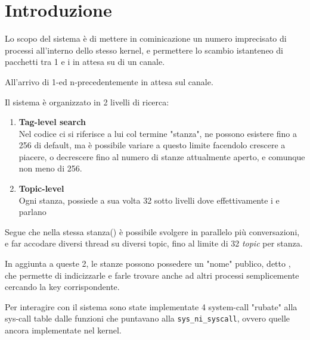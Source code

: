 \section{Introduzione}

Lo scopo del sistema è di mettere in cominicazione un numero imprecisato di
processi all'interno dello stesso kernel, e permettere lo scambio istanteneo
di pacchetti tra 1 \Writer e i \Reader in attesa su di un canale.

All'arrivo di 1-\Writer ed n-\Reader precedentemente in attesa sul canale.

Il sistema è organizzato in 2 livelli di ricerca:
\begin{enumerate}
    \item \textbf{Tag-level search} \\
    Nel codice ci si riferisce a lui col termine "stanza", ne possono esistere fino a 256 di default,
    ma è possibile variare a \RunTime questo limite facendolo crescere a piacere, o decrescere fino al
    numero di stanze attualmente aperto, e comunque non meno di 256.
    \item \textbf{Topic-level} \\
    Ogni stanza, possiede a sua volta 32 sotto livelli dove effettivamente i \Reader  e \Writer  parlano
\end{enumerate}

Segue che nella stessa stanza(\tagSys) è possibile svolgere in parallelo più conversazioni, e far accodare
diversi thread su diversi topic, fino al limite di 32 \textit{topic} per stanza.

In aggiunta a queste 2, le stanze possono possedere un "nome" publico, detto \keySys, che permette di
indicizzarle e farle trovare anche ad altri processi semplicemente cercando la key corrispondente.

Per interagire con il sistema sono state implementate 4 system-call "rubate" alla sys-call table dalle funzioni che
puntavano alla \verb|sys_ni_syscall|, ovvero quelle ancora implementate nel kernel.

